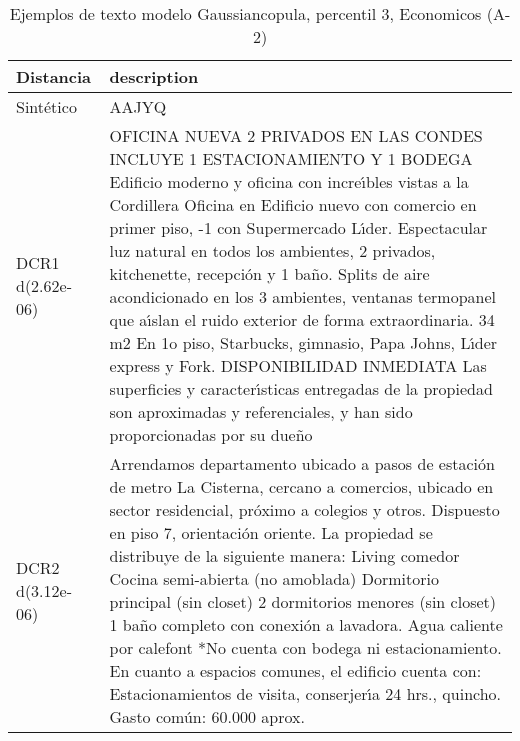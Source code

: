 \begin{table}[H]
\centering
\fontsize{10}{14}\selectfont
\caption{Ejemplos de texto modelo Gaussiancopula, percentil 3, Economicos (A-2)}
\label{table-example-economicos-a-2-gaussiancopula-3p-text}
\begin{tabular}{|l|m{35em}|}
\hline
\rowcolor[gray]{0.8}
Distancia & description \\
\hline Sintético & AAJYQ \\
\hline DCR1 d(2.62e-06) & OFICINA NUEVA 2 PRIVADOS EN LAS CONDES INCLUYE 1 ESTACIONAMIENTO Y 1 BODEGA  Edificio moderno y oficina con incre{\'\i}bles vistas a la Cordillera  Oficina en Edificio nuevo con comercio en primer piso, -1 con Supermercado L{\'\i}der. Espectacular luz natural en todos los ambientes, 2 privados, kitchenette, recepci\'on y 1 ba\~no. Splits de aire acondicionado en los 3 ambientes, ventanas termopanel que a{\'\i}slan el ruido exterior de forma extraordinaria.  34 m2  En 1o piso, Starbucks, gimnasio, Papa Johns, L{\'\i}der express y Fork.   DISPONIBILIDAD INMEDIATA   Las superficies y caracter{\'\i}sticas entregadas de la propiedad son aproximadas y referenciales, y han sido proporcionadas por su due\~no \\
\hline DCR2 d(3.12e-06) & Arrendamos departamento ubicado a pasos de estaci\'on de metro La Cisterna, cercano a comercios, ubicado en sector residencial, pr\'oximo a colegios y otros.  Dispuesto en piso 7, orientaci\'on oriente.  La propiedad se distribuye de la siguiente manera:  Living comedor Cocina semi-abierta (no amoblada) Dormitorio principal (sin closet) 2 dormitorios menores (sin closet) 1 ba\~no completo con conexi\'on a lavadora. Agua caliente por calefont  *No cuenta con bodega ni estacionamiento.  En cuanto a espacios comunes, el edificio cuenta con:  Estacionamientos de visita, conserjer{\'\i}a 24 hrs., quincho.  Gasto com\'un: 60.000 aprox. \\
\hline
\end{tabular}
\end{table}
